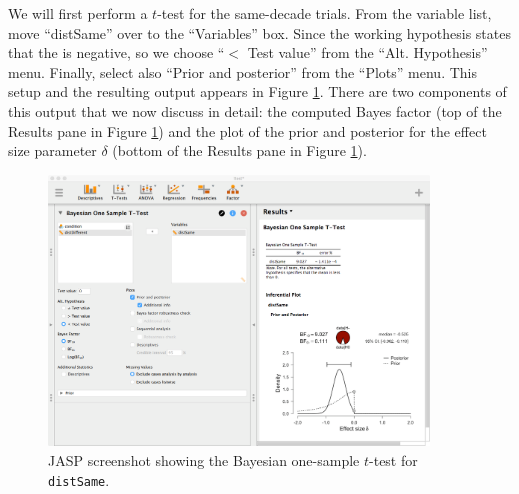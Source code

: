 \documentclass[english,,doc,floatsintext]{apa6}
\begin{document}
We will first perform a \(t\)-test for the same-decade trials. From the variable list, move \enquote{distSame} over to the \enquote{Variables} box. Since the working hypothesis states that the is negative, so we choose \enquote{\(<\) Test value} from the \enquote{Alt. Hypothesis} menu. Finally, select also \enquote{Prior and posterior} from the \enquote{Plots} menu. This setup and the resulting output appears in Figure \ref{fig:ttestBayes}. There are two components of this output that we now discuss in detail: the computed Bayes factor (top of the Results pane in Figure \ref{fig:ttestBayes}) and the plot of the prior and posterior for the effect size parameter \(\delta\) (bottom of the Results pane in Figure \ref{fig:ttestBayes}).

\begin{figure}
\centering
\includegraphics[width=0.9\textwidth,height=\textheight]{figures/ttestBayes.png}
\caption{\label{fig:ttestBayes}JASP screenshot showing the Bayesian one-sample \(t\)-test for \texttt{distSame}.}
\end{figure}
\end{document}

